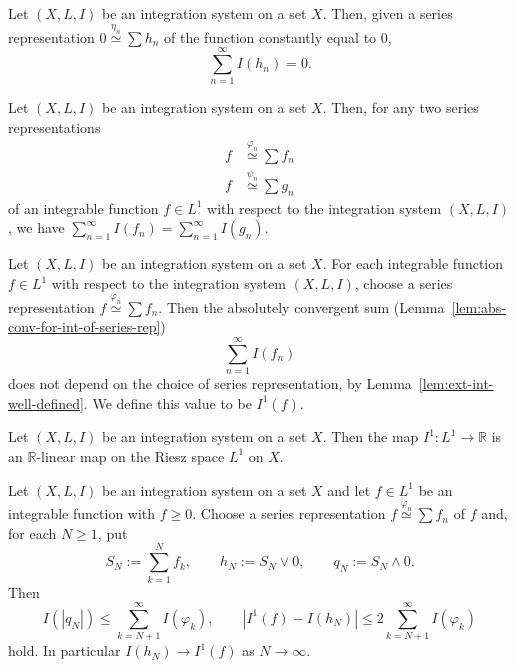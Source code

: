 \begin{lemma}\label{lem:ext-int-of-zero-func}
  Let $(X,L,I)$ be an integration system on a set $X$.
  Then, given a series representation $0\overset{\eta_n}{\simeq}\sum h_n$ of the
  function constantly equal to $0$,
  \[
    \sum_{n=1}^\infty I(h_n)=0 .
  \]
\end{lemma}

\begin{lemma}\label{lem:ext-int-well-defined}
  Let $(X,L,I)$ be an integration system on a set $X$.
  Then, for any two series representations
  \begin{align*}
    f&\overset{\varphi_n}{\simeq}\sum f_n \\
    f&\overset{\psi_n}{\simeq}\sum g_n
  \end{align*}
  of an integrable function $f\in L^1$ with respect to the integration system
  $(X,L,I)$, we have $\sum_{n=1}^\infty I(f_n)=\sum_{n=1}^\infty I(g_n)$.
\end{lemma}

\begin{definition}
  Let $(X,L,I)$ be an integration system on a set $X$.
  For each integrable function $f\in L^1$ with respect to the integration system
  $(X,L,I)$, choose a series representation
  $f\overset{\varphi_n}{\simeq}\sum f_n$.
  Then the absolutely convergent sum
  (Lemma~\ref{lem:abs-conv-for-int-of-series-rep})
  \[
    \sum_{n=1}^\infty I(f_n)
  \]
  does not depend on the choice of series representation, by
  Lemma~\ref{lem:ext-int-well-defined}.
  We define this value to be $I^1(f)$.
\end{definition}

\begin{lemma}\label{lem:ext-int-is-linear}
  Let $(X,L,I)$ be an integration system on a set $X$.
  Then the map $I^1:L^1\to\mathbb{R}$ is an $\mathbb{R}$-linear map on the Riesz
  space $L^1$ on $X$.
\end{lemma}

\begin{lemma}\label{lem:positive-series-representation-truncation}
  Let $(X,L,I)$ be an integration system on a set $X$ and let
  $f\in L^1$ be an integrable function with $f\ge0$.
  Choose a series representation $f\overset{\varphi_n}{\simeq}\sum f_n$ of $f$
  and, for each $N\ge1$, put
  \[
    S_N:=\sum_{k=1}^Nf_k,\qquad h_N:=S_N\vee0,\qquad q_N:=S_N\wedge0 .
  \]
  Then
  \[
    I(|q_N|)\le\sum_{k=N+1}^\infty I(\varphi_k),
    \qquad
    |I^1(f)-I(h_N)|\le2\sum_{k=N+1}^\infty I(\varphi_k)
  \]
  hold. In particular $I(h_N)\longrightarrow I^1(f)$ as $N\to\infty$.
\end{lemma}

